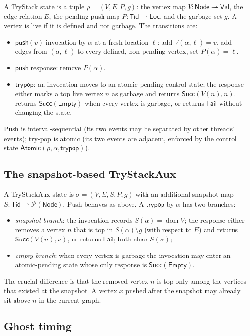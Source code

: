 \documentclass[11pt]{article}
\theoremstyle{definition}
\theoremstyle{remark}
\newcommand{\Tid}{\mathsf{Tid}}
\newcommand{\Loc}{\mathsf{Loc}}
\newcommand{\Val}{\mathsf{Val}}
\newcommand{\Node}{\mathsf{Node}}
\newcommand{\dom}{\mathop{\mathrm{dom}}}
\newcommand{\Atomic}{\mathsf{Atomic}}
\newcommand{\Push}{\mathsf{push}}
\newcommand{\TryPop}{\mathsf{trypop}}
\newcommand{\Succ}{\mathsf{Succ}}
\newcommand{\Fail}{\mathsf{Fail}}
\newcommand{\Empty}{\mathsf{Empty}}
\newcommand{\conc}{\sigma}
\newcommand{\abst}{\rho}
\begin{document}
A TryStack state is a tuple \(\abst=(V,E,P,g)\): the vertex map
\(V:\Node\rightharpoonup\Val\), the edge relation \(E\), the pending-push map
\(P:\Tid\rightharpoonup\Loc\), and the garbage set \(g\).  A vertex is live if
it is defined and not garbage.  The transitions are:
\begin{itemize}[nosep]
\item \(\Push(v)\) invocation by \(\alpha\) at a fresh location \(\ell\):
  add \(V(\alpha,\ell)=v\), add edges from \((\alpha,\ell)\) to every
  defined, non-pending vertex, set \(P(\alpha)=\ell\).
\item \(\Push\) response: remove \(P(\alpha)\).
\item \(\TryPop\): an invocation moves to an atomic-pending control state;
  the response either marks a top live vertex \(n\) as garbage and returns
  \(\Succ(V(n),n)\), returns \(\Succ(\Empty)\) when every vertex is garbage,
  or returns \(\Fail\) without changing the state.
\end{itemize}
Push is interval-sequential (its two events may be separated by other
threads' events); try-pop is atomic (its two events are adjacent, enforced by
the control state \(\Atomic(\abst,\alpha,\TryPop)\)).

\subsection{The snapshot-based TryStackAux}

A TryStackAux state is \(\conc=(V,E,S,P,g)\) with an additional snapshot map
\(S:\Tid\rightharpoonup\mathcal P(\Node)\).  Push behaves as above.  A
\(\TryPop\) by \(\alpha\) has two branches:
\begin{itemize}[nosep]
\item \emph{snapshot branch}: the invocation records \(S(\alpha)=\dom V\);
  the response either removes a vertex \(n\) that is top in
  \(S(\alpha)\setminus g\) (with respect to \(E\)) and returns
  \(\Succ(V(n),n)\), or returns \(\Fail\); both clear \(S(\alpha)\);
\item \emph{empty branch}: when every vertex is garbage the invocation may
  enter an atomic-pending state whose only response is \(\Succ(\Empty)\).
\end{itemize}
The crucial difference is that the removed vertex \(n\) is top only among
the vertices that existed at the snapshot.  A vertex \(x\) pushed after the
snapshot may already sit above \(n\) in the current graph.

\subsection{Ghost timing}
\end{document}
